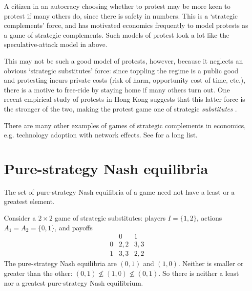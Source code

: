 \begin{example}
	\label{example:protest}
	A citizen in an autocracy choosing whether to protest may be more keen to protest if many others do, since there is safety in numbers. This is a `strategic complements' force, and has motivated economics frequently to model protests as a game of strategic complements. Such models of protest look a lot like the speculative-attack model in  above.

	This may not be such a good model of protests, however, because it neglects an obvious `strategic substitutes' force: since toppling the regime is a public good and protesting incurs private costs (risk of harm, opportunity cost of time, etc.), there is a motive to free-ride by staying home if many others turn out. One recent empirical study of protests in Hong Kong suggests that this latter force is the stronger of the two, making the protest game one of strategic \emph{substitutes} \parencite{CantoniYangYuchtmanZhang2019}. 
\end{example}

There are many other examples of games of strategic complements in economics, e.g. technology adoption with network effects. See \textcite{MilgromRoberts1990} for a long list.



\section{Pure-strategy Nash equilibria}
\label{spm:nash}

The set of pure-strategy Nash equilibria of a game need not have a least or a greatest element.

\begin{example}
	\label{example:2x2_subst}
	Consider a $2 \times 2$ game of strategic substitutes: players $I=\{1,2\}$, actions $A_1 = A_2 = \{0,1\}$, and payoffs
	\begin{equation*}
		\begin{array}{c|cc}
			  & 0   & 1 \\ \hline
			0 & 2,2 & 3,3 \\
			1 & 3,3 & 2,2
		\end{array}
	\end{equation*}
	The pure-strategy Nash equilibria are $(0,1)$ and $(1,0)$. Neither is smaller or greater than the other: $(0,1) \nleq (1,0) \nleq (0,1)$. So there is neither a least nor a greatest pure-strategy Nash equilibrium.
\end{example}

